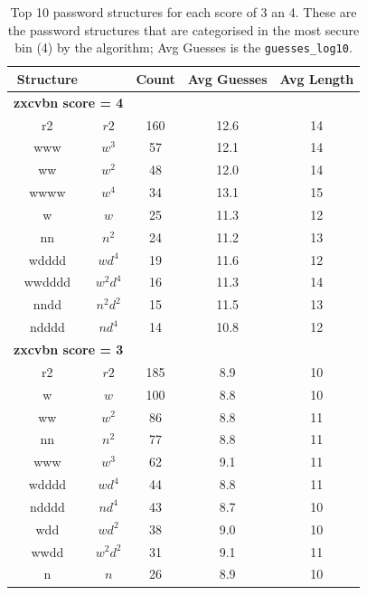 \begin{table}
    \centering
    \caption{Top 10 password structures for each \zxcvbn score of 3 an 4. These are the password structures that are categorised in the most secure bin (4) by the \zxcvbnnocite algorithm; Avg Guesses is the \zxcvbnnocite \texttt{guesses\_log10}.}
    \label{table:bin4}
    \setlength\tabcolsep{1pt} %
    {\renewcommand{\arraystretch}{0.5}%
    \begin{tabular}{ccc|c|c}
    \toprule
    \textbf{Structure} & & \textbf{Count} & \textbf{Avg Guesses} & \textbf{Avg Length} \\
    \midrule
        \multicolumn{2}{c}{\textbf{zxcvbn score = 4}}  & & & \\
        r2 & $r2$ 	 & 160 & 12.6 & 14 \\
        www & $w^3$ 	 & 57 & 12.1 & 14 \\
        ww & $w^2$ 	 & 48 & 12.0 & 14 \\
        wwww & $w^4$ 	 & 34 & 13.1 & 15 \\
        w & $w$ 	 & 25 & 11.3 & 12 \\
        nn & $n^2$ 	 & 24 & 11.2 & 13 \\
        wdddd & $wd^4$ 	 & 19 & 11.6 & 12 \\
        wwdddd & $w^2d^4$ 	 & 16 & 11.3 & 14 \\
        nndd & $n^2d^2$ 	 & 15 & 11.5 & 13 \\
        ndddd & $nd^4$ 	 & 14 & 10.8 & 12 \\
        \midrule
        \multicolumn{2}{c}{\textbf{zxcvbn score = 3}}  & & & \\
        r2 & $r2$ 	 & 185 & 8.9 & 10 \\
        w & $w$ 	 & 100 & 8.8 & 10 \\
        ww & $w^2$ 	 & 86 & 8.8 & 11 \\
        nn & $n^2$ 	 & 77 & 8.8 & 11 \\
        www & $w^3$ 	 & 62 & 9.1 & 11 \\
        wdddd & $wd^4$ 	 & 44 & 8.8 & 11 \\
        ndddd & $nd^4$ 	 & 43 & 8.7 & 10 \\
        wdd & $wd^2$ 	 & 38 & 9.0 & 10 \\
        wwdd & $w^2d^2$ 	 & 31 & 9.1 & 11 \\
        n & $n$ 	 & 26 & 8.9 & 10 \\
    \bottomrule
    \end{tabular}
    } %
    \vspace{-1em}
\end{table}
\vspace*{-0.2cm}

